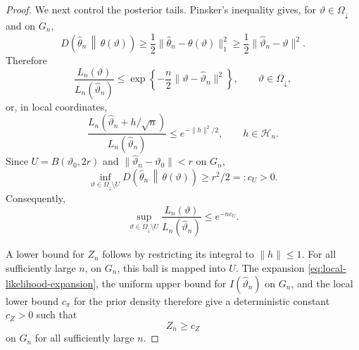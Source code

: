 \documentclass[10pt,a4paper]{amsart}
\theoremstyle{named}
\theoremstyle{named1}
\theoremstyle{plain}
\theoremstyle{remark}
\begin{document}
\begin{proof}
We next control the posterior tails. Pinsker's inequality gives, for
$\vartheta\in\Omega_{\downarrow}$ and on $G_n$,
\[
    D\!\left(\widehat\theta_n\,\middle\|\,\theta(\vartheta)\right)
    \geq\frac12\|\widehat\theta_n-\theta(\vartheta)\|_1^2
    \geq\frac12\|\widehat\vartheta_n-\vartheta\|^2.
\]
Therefore
\begin{equation}
    \frac{L_n(\vartheta)}{L_n(\widehat\vartheta_n)}
    \leq
    \exp\left\{-\frac n2\|\vartheta-\widehat\vartheta_n\|^2\right\},
    \qquad \vartheta\in\Omega_{\downarrow},
    \label{eq:local-gaussian-bound}
\end{equation}
or, in local coordinates,
\begin{equation}
    \frac{L_n(\widehat\vartheta_n+h/\sqrt n)}{
          L_n(\widehat\vartheta_n)}
    \leq e^{-\|h\|^2/2},
    \qquad h\in\mathcal H_n.
    \label{eq:local-h-bound}
\end{equation}
Since $U=B(\vartheta_0,2r)$ and
$\|\widehat\vartheta_n-\vartheta_0\|<r$ on $G_n$,
\begin{equation}
    \inf_{\vartheta\in\Omega_{\downarrow}\setminus U}
    D\!\left(\widehat\theta_n\,\middle\|\,\theta(\vartheta)\right)
    \geq r^2/2=:c_U>0.
    \label{outside_U_bound}
\end{equation}
Consequently,
\begin{equation}
    \sup_{\vartheta\in\Omega_{\downarrow}\setminus U}
    \frac{L_n(\vartheta)}{L_n(\widehat\vartheta_n)}
    \leq e^{-nc_U}.
    \label{eq:outside-neighborhood-bound}
\end{equation}

A lower bound for $Z_n$ follows by restricting its integral to
$\|h\|\leq1$. For all sufficiently large $n$, on $G_n$, this ball is
mapped into $U$. The expansion \eqref{eq:local-likelihood-expansion},
the uniform upper bound for $I(\widehat\vartheta_n)$ on $G_n$, and the
local lower bound $c_\pi$ for the prior density therefore give a
deterministic constant $c_Z>0$ such that
\begin{equation}
    Z_n\geq c_Z
    \label{eq:normalizing-lower-bound}
\end{equation}
on $G_n$ for all sufficiently large $n$.


\end{proof}
\end{document}
